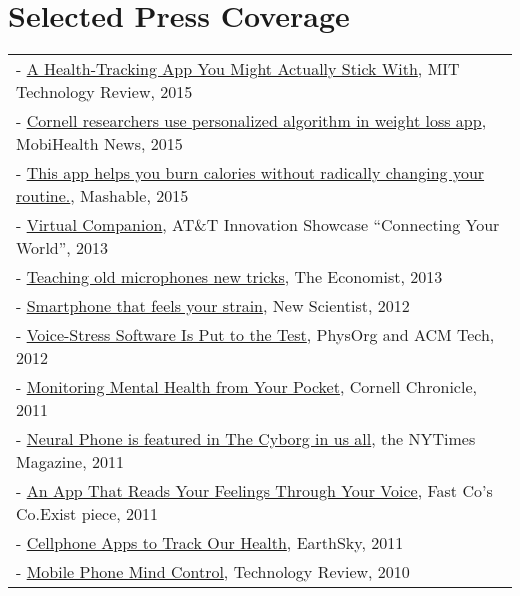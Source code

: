 \documentclass[10pt,fullpage]{article}
\begin{document}
\section*{\textbf{Selected Press Coverage}}
\vspace{-0.7em}
\begin{longtable}{>{\everypar{\hangindent0.5in}}p{6in}}
	- \href{https://www.technologyreview.com/s/539721/a-health-tracking-app-you-might-actually-stick-with/}{A Health-Tracking App You Might Actually Stick With}, MIT Technology Review, 2015\\
	- \href{https://www.mobihealthnews.com/45795/cornell-researchers-use-personalized-algorithm-in-weight-loss-app/}{Cornell researchers use personalized algorithm in weight loss app}, MobiHealth News, 2015\\
	- \href{http://mashable.com/2015/07/30/health-tracking-app/#vsDHQmjzJ8qx}{This app helps you burn calories without radically changing your routine.}, Mashable, 2015\\
	- \href{http://www.att.com/gen/press-room?pid=23974}{Virtual Companion}, AT\&T Innovation Showcase ``Connecting Your World'', 2013\\
	- \href{http://www.economist.com/news/technology-quarterly/21578518-sensor-technology-microphones-are-designed-capture-sound-they-turn-out}{Teaching old microphones new tricks}, The Economist, 2013\\
	- \href{http://www.newscientist.com/article/mg21528775.400-smartphone-that-feels-your-strain.html}{Smartphone that feels your strain}, New Scientist, 2012\\
	- \href{http://phys.org/news/2012-08-voice-stress-software.html}{Voice-Stress Software Is Put to the Test}, PhysOrg and ACM Tech, 2012\\
	- \href{http://www.news.cornell.edu/stories/2011/10/your-phone-counselor-smartphone-monitors-stress}{Monitoring Mental Health from Your Pocket}, Cornell Chronicle, 2011\\
	- \href{http://www.nytimes.com/2011/09/18/magazine/the-cyborg-in-us-all.html?_r=2\&pagewanted=all}{Neural Phone is featured in The Cyborg in us all},  the NYTimes Magazine, 2011\\
	- \href{http://www.fastcoexist.com/1678760/get-some-therapy-from-an-app-that-reads-your-feelings-through-your-voice}{An App That Reads Your Feelings Through Your Voice}, Fast Co's Co.Exist piece, 2011\\
	- \href{http://earthsky.org/human-world/tanzeem-choudhury-develops-cellphone-apps-to-track-our-health}{Cellphone Apps to Track Our Health}, EarthSky, 2011\\
	- \href{http://www.technologyreview.com/view/418258/mobile-phone-mind-control/}{Mobile Phone Mind Control}, Technology Review, 2010\\
\end{longtable}
\end{document}
